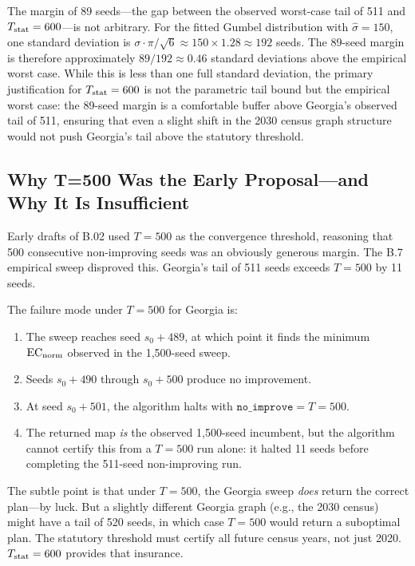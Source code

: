 The margin of 89 seeds---the gap between the observed worst-case tail of 511
and $T_{\mathrm{stat}} = 600$---is not arbitrary.
For the fitted Gumbel distribution with $\hat\sigma = 150$, one standard deviation
is $\sigma \cdot \pi/\sqrt{6} \approx 150 \times 1.28 \approx 192$ seeds.
The 89-seed margin is therefore approximately $89/192 \approx 0.46$ standard
deviations above the empirical worst case.
While this is less than one full standard deviation, the primary justification
for $T_{\mathrm{stat}} = 600$ is not the parametric tail bound but the empirical worst case:
the 89-seed margin is a comfortable buffer above Georgia's observed tail of 511,
ensuring that even a slight shift in the 2030 census graph structure would not
push Georgia's tail above the statutory threshold.

\subsection{Why T=500 Was the Early Proposal---and Why It Is Insufficient}

Early drafts of B.02 used $T = 500$ as the convergence threshold, reasoning
that 500 consecutive non-improving seeds was an obviously generous margin.
The B.7 empirical sweep disproved this.
Georgia's tail of 511 seeds exceeds $T = 500$ by 11 seeds.

The failure mode under $T = 500$ for Georgia is:
\begin{enumerate}
\item The sweep reaches seed $s_0 + 489$, at which point it finds the minimum
      $\mathrm{EC}_{\mathrm{norm}}$ observed in the 1{,}500-seed sweep.
\item Seeds $s_0 + 490$ through $s_0 + 500$ produce no improvement.
\item At seed $s_0 + 501$, the algorithm halts with $\mathtt{no\_improve} = T
      = 500$.
\item The returned map \emph{is} the observed 1{,}500-seed incumbent, but the
      algorithm cannot certify this from a $T=500$ run alone:
      it halted 11 seeds before completing the 511-seed non-improving run.
\end{enumerate}

The subtle point is that under $T = 500$, the Georgia sweep \emph{does} return
the correct plan---by luck.
But a slightly different Georgia graph (e.g., the 2030 census) might have a
tail of 520 seeds, in which case $T = 500$ would return a suboptimal plan.
The statutory threshold must certify all future census years, not just 2020.
$T_{\mathrm{stat}} = 600$ provides that insurance.
